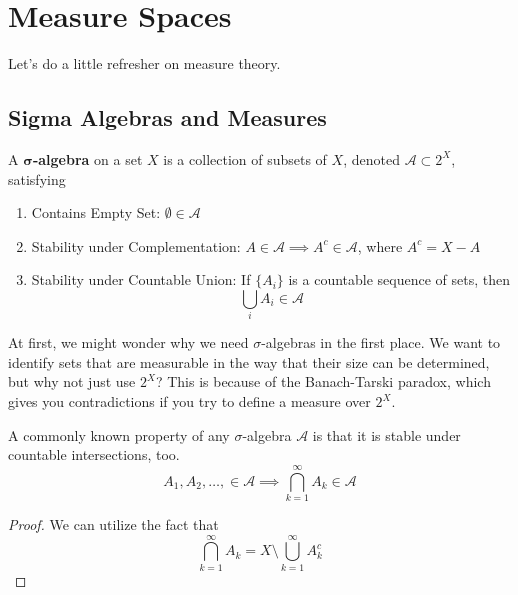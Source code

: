 \section{Measure Spaces}

  Let's do a little refresher on measure theory. 

\subsection{Sigma Algebras and Measures}

  \begin{definition}
    A $\boldsymbol{\sigma}$\textbf{-algebra} on a set $X$ is a collection of subsets of $X$, denoted $\mathcal{A} \subset 2^X$, satisfying
    \begin{enumerate}
      \item Contains Empty Set: $\emptyset \in \mathcal{A}$ 
      \item Stability under Complementation: $A \in \mathcal{A} \implies A^c \in \mathcal{A}$, where $A^c = X - A$ 
      \item Stability under Countable Union: If $\{A_i\}$ is a countable sequence of sets, then 
      \begin{equation}
        \bigcup_i A_i \in \mathcal{A}
      \end{equation}
    \end{enumerate}
  \end{definition}

  At first, we might wonder why we need $\sigma$-algebras in the first place. We want to identify sets that are measurable in the way that their size can be determined, but why not just use $2^X$? This is because of the Banach-Tarski paradox, which gives you contradictions if you try to define a measure over $2^X$.  

  \begin{lemma}
    A commonly known property of any $\sigma$-algebra $\mathcal{A}$ is that it is stable under countable intersections, too. 
    \begin{equation}
      A_1, A_2, \ldots, \in \mathcal{A} \implies \bigcap_{k=1}^\infty A_k \in \mathcal{A}
    \end{equation}
  \end{lemma}
  \begin{proof}
    We can utilize the fact that 
    \begin{equation}
      \bigcap_{k=1}^\infty A_k = X \setminus \bigcup_{k=1}^\infty A_k^c
    \end{equation}
  \end{proof}

